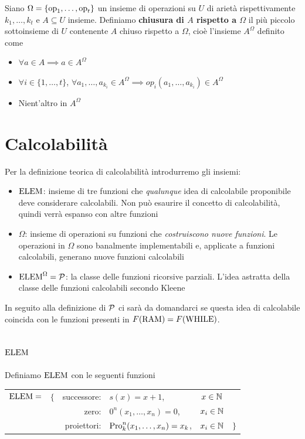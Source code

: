 Siano $\Omega = \{\operatorname{op}_1, \dots, \operatorname{op}_t\}$ un insieme di operazioni su $U$ di arietà rispettivamente $k_1, \dots, k_t$ e $A \subseteq U$ insieme. Definiamo \textbf{chiusura di $A$ rispetto a $\Omega$} il più piccolo sottoinsieme di $U$ contenente $A$ chiuso rispetto a $\Omega$, cioè l'insieme $A^\Omega$ definito come
\begin{itemize}
	\item $\forall a \in A \implies a \in A^\Omega$
	\item $\forall i \in \{1, \dots, t\}$, $\forall a_1, \dots, a_{k_i} \in A^\Omega \implies op_i \left(a_1, \dots, a_{k_i}\right) \in A^\Omega$
	\item Nient'altro in $A^\Omega$
\end{itemize}


\section{Calcolabilità}
Per la definizione teorica di calcolabilità introdurremo gli insiemi: 
\begin{itemize} 
	\item \textbf{$\text{ELEM}$}: insieme di tre funzioni che \textit{qualunque} idea di calcolabile proponibile deve considerare calcolabili. Non può esaurire il concetto di calcolabilità, quindi verrà espanso con altre funzioni
	
	\item $\Omega$: insieme di operazioni su funzioni che \textit{costruiscono nuove funzioni}. Le operazioni in $\Omega$ sono banalmente implementabili e, applicate a funzioni calcolabili, generano nuove funzioni calcolabili
	
	\item \textbf{$\text{ELEM}^\Omega = \mathcal{P}$}: la classe delle funzioni ricorsive parziali. L'idea astratta della classe delle funzioni calcolabili secondo Kleene
\end{itemize}

In seguito alla definizione di $\mathcal{P}$ ci sarà da domandarci se questa idea di calcolabile coincida con le funzioni presenti in $F(\text{RAM}) = F(\text{WHILE})$.\\

\subsection{$\text{ELEM}$}
Definiamo $\text{ELEM}$ con le seguenti funzioni
\begin{center}
	\begin{tabular}{r c r l c l}
		$\text{ELEM} = $ & $\{$ & successore: & $s(x) = x + 1$, & $x \in \mathbb{N}$ & \\
		&& zero: & $0^n (x_1, \dots, x_n) = 0$, & $x_i \in \mathbb{N}$ & \\
		&& proiettori: & $\text{Pro}_k^n (x_1, \dots, x_n) = x_k$, & $x_i \in \mathbb{N}$& $\}$ \\
	\end{tabular}
\end{center}

